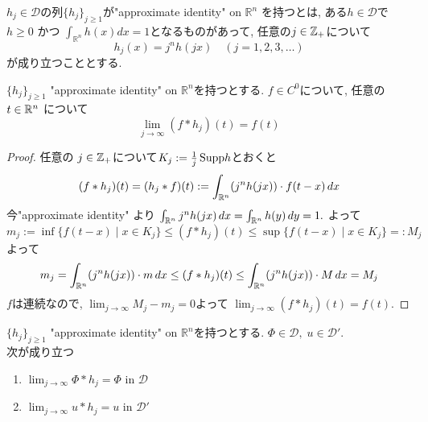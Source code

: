 \begin{tcolorbox}[mybox]
\begin{defn}\cite[Definition 6.31]{Rud}
\label{defn-H-2.11}
$h_j \in \mathcal{D}$の列\(\{ h_j \}_{j \geq 1}\)が"approximate identity" on \(\mathbb{R}^n\) を持つとは, ある\(h \in \mathcal{D}\)で\(h \geq 0\) かつ \(\int_{\mathbb{R}^n} h(x) dx = 1\)となるものがあって, 任意の$j \in \mathbb{Z}_+$について
\[
h_j(x) = j^n h(jx) \quad (j=1,2,3,\ldots)
\]
が成り立つこととする. 
\end{defn}
\end{tcolorbox}
\begin{tcolorbox}[mybox]
\begin{lem}%
\label{lem-H-2.12}
\(\{h_j\}_{j \ge 1}\) "approximate identity" on \(\mathbb{R}^n\)を持つとする.  
\(f \in C^0\)について, 任意の$t  \in \mathbb{R}^n$ について
 $$
 \lim_{j \to \infty} (f * h_j)(t) = f(t)
 $$
\end{lem}
\end{tcolorbox}
\begin{proof}
任意の \( j \in \mathbb{Z}_+\)について\(K_j := \tfrac{1}{j} \, {\rm Supp} h\)とおくと
\[
(f \ast h_j)(t) = (h_j \ast f)(t) :
= \int_{\mathbb{R}^n} (j^n h(jx)) \cdot f(t-x)\, dx
\]
今"approximate identity" より
\(\int_{\mathbb{R}^n} j^n h(jx)\, dx = \int_{\mathbb{R}^n} h(y)\, dy = 1.\) よって
\[
m_j :=\inf \{ f(t-x) \mid x \in K_j \} \le (f \ast h_j)(t) \le \sup \{ f(t-x) \mid x \in K_j \}=:M_j
\]
よって
$$
m_j=
\int_{\mathbb{R}^n} (j^n h(jx))\cdot m \, dx
\le (f \ast h_j)(t) \le 
\int_{\mathbb{R}^n} (j^n h(jx))\cdot M \, dx
=M_j
$$
$f$は連続なので, $\lim_{j \to \infty}M_j-m_j =0$よって
\(\lim_{j \to \infty} (f \ast h_j)(t) = f(t).\)
\end{proof}

\begin{tcolorbox}[mybox]
\begin{lem}\cite[Theorem 6.32]{Rud}
\label{lem-H-2.13}
\(\{h_j\}_{j \ge 1}\) "approximate identity" on \(\mathbb{R}^n\)を持つとする.  
\(\Phi \in \mathcal{D}, \; u \in \mathcal{D}'\). \\

次が成り立つ
\begin{enumerate}[label=$(\alph*)$]
\item  \(\lim_{j \to \infty} \Phi * h_j = \Phi \) in \( \mathcal{D} \)
\item \(\lim_{j \to \infty} u * h_j = u\) in \( \mathcal{D}'\)
\end{enumerate}
\end{lem}
\end{tcolorbox}

